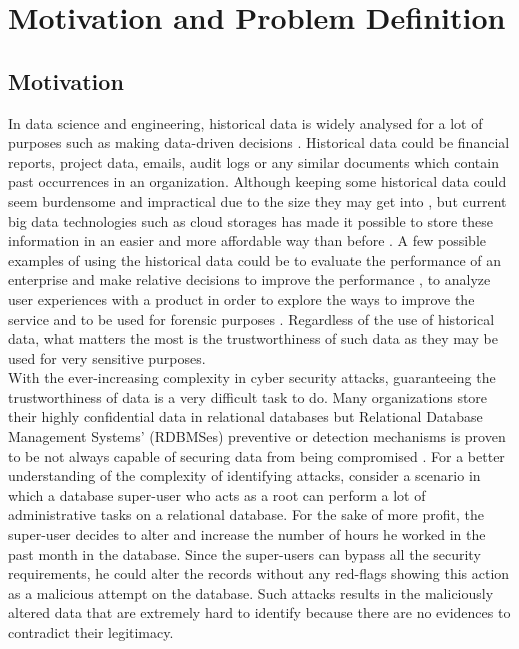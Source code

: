 \chapter{Motivation and Problem Definition}

\section{Motivation}

In data science and engineering, historical data is widely analysed for a lot of purposes such as making data-driven decisions \cite{rose2016datascience}. Historical data could be financial reports, project data, emails, audit logs or any similar documents which contain past occurrences in an organization. Although keeping some historical data could seem burdensome and impractical due to the size they may get into \cite{crosby2009tamper-evident}, but current big data technologies such as cloud storages has made it possible to store these information in an easier and more affordable way than before \cite{talia2015dataanalysis}. A few possible examples of using the historical data could be to evaluate the performance of an enterprise and make relative decisions to improve the performance \cite{ghasemaghaei2015impactsOB}, to analyze user experiences with a product in order to explore the ways to improve the service \cite{klein2013analysis} and to be used for forensic purposes \cite{wagner2018detect}. Regardless of the use of historical data, what matters the most is the trustworthiness of such data \cite{jain2013trustworthy} as they may be used for very sensitive purposes.\\
With the ever-increasing complexity in cyber security attacks, guaranteeing the trustworthiness of data is a very difficult task to do. Many organizations store their highly confidential data in relational databases but Relational Database Management Systems’ (RDBMSes) preventive or detection mechanisms is proven to be not always capable of securing data from being compromised \cite{wanger2017carving}. For a better understanding of the complexity of identifying attacks, consider a scenario in which a database super-user who acts as a root can perform a lot of administrative tasks on a relational database. For the sake of more profit, the super-user decides to alter and increase the number of hours he worked in the past month in the database. Since the super-users can bypass all the security requirements, he could alter the records without any red-flags showing this action as a malicious attempt on the database. Such attacks results in the maliciously altered data that are extremely hard to identify because there are no evidences to contradict their legitimacy.\\
